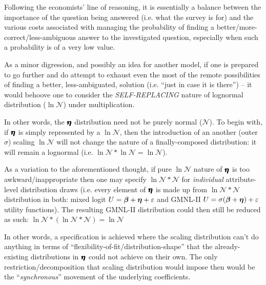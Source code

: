 \documentclass[12pt,a4paper]{article}
\begin{document}
Following the economists' line of reasoning, it is essentially a balance between the importance of the question being answered (i.e. what the survey is for) and the various costs associated with managing the probability of finding a better/more-correct/less-ambiguous answer to the investigated question, especially when such a probability is of a very low value. 

As a minor digression, and possibly an idea for another model, if one is prepared to go further and do attempt to exhaust even the most of the remote possibilities of finding a better, less-ambiguated, solution (i.e. ``just in case it is there'') -- it would behoove one to consider the \textit{SELF-REPLACING} nature of lognormal distribution (\(\ln\mathcal{N}\)) under multiplication. 

In other words, the \(\pmb{\hm{\eta}}\) distribution need not be purely normal (\(\mathcal{N}\)). To begin with, if \(\pmb{\hm{\eta}}\) is simply represented by a \(\ln\mathcal{N}\), then the introduction of an another (outer \(\sigma\)) scaling \(\ln\mathcal{N}\) will not change the nature of a finally-composed distribution: it will remain a lognormal (i.e. \(\ln\mathcal{N}*\ln\mathcal{N}=\ln\mathcal{N}\)).

As a variation to the aforementioned thought, if pure \(\ln\mathcal{N}\) nature of \(\pmb{\hm{\eta}}\) is too awkward/inappropriate then one may specify \(\ln\mathcal{N}*\mathcal{N}\) for \textit{individual} attribute-level distribution draws (i.e. every element of \(\pmb{\hm{\eta}}\) is made up from \(\ln\mathcal{N}*\mathcal{N}\) distribution in both: mixed logit \(U=\hm{\beta}+\hm{\eta} + \varepsilon\) and GMNL-II \(U=\sigma(\hm{\beta}+\hm{\eta}) + \varepsilon\) utility functions). The resulting GMNL-II distribution could then still be reduced as such: \(\ln\mathcal{N}*(\ln\mathcal{N}*\mathcal{N})=\ln\mathcal{N}\)

In other words, a specification is achieved where the scaling distribution can't do anything in terms of ``flexibility-of-fit/distribution-shape'' that the already-existing distributions in \(\pmb{\hm{\eta}}\) could not achieve on their own. The only restriction/decomposition that scaling distribution would impose then would be the ``\textit{synchronous}'' movement of the underlying coefficients. 
\end{document}
